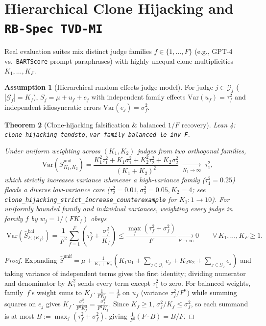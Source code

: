 \documentclass[11pt]{article}
\theoremstyle{plain}
\newtheorem{theorem}{Theorem}[section]
\theoremstyle{definition}
\newtheorem{assumption}[theorem]{Assumption}
\theoremstyle{remark}
\newcommand{\Var}{\mathrm{Var}}
\newcommand{\lident}[1]{{\small\texttt{#1}}}
\begin{document}
\section{Hierarchical Clone Hijacking and \texttt{RB-Spec TVD-MI}}

Real evaluation suites mix distinct judge families $f \in \{1,\dots,F\}$ (e.g.,
GPT-4 vs.\ \texttt{BARTScore} prompt paraphrases) with highly unequal clone
multiplicities $K_1,\dots,K_F$.

\begin{assumption}[Hierarchical random-effects judge model]
For judge $j \in \mathcal{G}_f$ ($|\mathcal{G}_f| = K_f$),
$S_j = \mu + u_f + e_j$ with independent family effects $\Var(u_f) = \tau_f^2$
and independent idiosyncratic errors $\Var(e_j) = \sigma_f^2$.
\end{assumption}

\begin{theorem}[Clone-hijacking falsification \& balanced $1/F$ recovery]
\noindent\textit{Lean 4:} \lident{clone\_\allowbreak hijacking\_\allowbreak tendsto},
\lident{var\_\allowbreak family\_\allowbreak balanced\_\allowbreak le\_\allowbreak inv\_\allowbreak F}.\par\medskip
Under uniform weighting across $(K_1, K_2)$ judges from two orthogonal families,
\begin{equation}
\boxed{\;
\Var\!\left(\bar{S}^{\mathrm{unif}}_{K_1,K_2}\right)
= \frac{K_1^2 \tau_1^2 + K_1 \sigma_1^2 + K_2^2 \tau_2^2 + K_2 \sigma_2^2}{(K_1 + K_2)^2}
\;\xrightarrow[K_1 \to \infty]{}\; \tau_1^2,\;}
\end{equation}
which strictly increases variance whenever a high-variance family ($\tau_1^2 = 0.25$)
floods a diverse low-variance core ($\tau_2^2 = 0.01, \sigma_2^2 = 0.05, K_2 = 4$;
see \lident{clone\_\allowbreak hijacking\_\allowbreak strict\_\allowbreak increase\_\allowbreak counterexample} for $K_1: 1 \to 10$).
For uniformly bounded family and individual variances, weighting every judge in family $f$ by $w_j = 1/(F K_f)$ obeys
\begin{equation}
\boxed{\;
\Var\!\left(\bar{S}^{\mathrm{bal}}_{F,\{K_f\}}\right)
= \frac{1}{F^2}\sum_{f=1}^F \left(\tau_f^2 + \frac{\sigma_f^2}{K_f}\right)
\le \frac{\max_f(\tau_f^2 + \sigma_f^2)}{F} \xrightarrow[F\to\infty]{} 0
\qquad \forall\, K_1,\dots,K_F \ge 1.\;}
\end{equation}
\end{theorem}
\begin{proof}
Expanding $\bar{S}^{\mathrm{unif}} = \mu + \frac{1}{K_1+K_2}(K_1 u_1 + \sum_{j \in \mathcal{G}_1} e_j + K_2 u_2 + \sum_{j \in \mathcal{G}_2} e_j)$
and taking variance of independent terms gives the first identity; dividing
numerator and denominator by $K_1^2$ sends every term except $\tau_1^2$ to zero.
For balanced weights, family~$f$'s weight sums to $K_f \cdot \frac{1}{F K_f} = \frac{1}{F}$
on $u_f$ (variance $\tau_f^2 / F^2$) while summing squares on $e_j$ gives
$K_f \cdot \frac{\sigma_f^2}{F^2 K_f^2} = \frac{\sigma_f^2}{F^2 K_f}$. Since $K_f \ge 1$,
$\sigma_f^2 / K_f \le \sigma_f^2$, so each summand is at most $B := \max_f(\tau_f^2 + \sigma_f^2)$,
giving $\frac{1}{F^2}(F \cdot B) = B / F$.
\end{proof}
\end{document}
